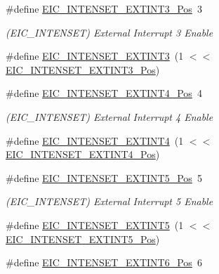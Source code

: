 \begin{DoxyCompactItemize}
\item 
\#define \mbox{\hyperlink{group___s_a_m_d21___e_i_c_gacdaef28157f0fefedf193ab4263975ea}{E\+I\+C\+\_\+\+I\+N\+T\+E\+N\+S\+E\+T\+\_\+\+E\+X\+T\+I\+N\+T3\+\_\+\+Pos}}~3
\begin{DoxyCompactList}\small\item\em (E\+I\+C\+\_\+\+I\+N\+T\+E\+N\+S\+ET) External Interrupt 3 Enable \end{DoxyCompactList}\item 
\#define \mbox{\hyperlink{group___s_a_m_d21___e_i_c_ga675accece5429161f799fe792021924f}{E\+I\+C\+\_\+\+I\+N\+T\+E\+N\+S\+E\+T\+\_\+\+E\+X\+T\+I\+N\+T3}}~(1 $<$$<$ \mbox{\hyperlink{group___s_a_m_d21___e_i_c_gacdaef28157f0fefedf193ab4263975ea}{E\+I\+C\+\_\+\+I\+N\+T\+E\+N\+S\+E\+T\+\_\+\+E\+X\+T\+I\+N\+T3\+\_\+\+Pos}})
\item 
\#define \mbox{\hyperlink{group___s_a_m_d21___e_i_c_ga5a46c4311103844b309fa994ff4390dd}{E\+I\+C\+\_\+\+I\+N\+T\+E\+N\+S\+E\+T\+\_\+\+E\+X\+T\+I\+N\+T4\+\_\+\+Pos}}~4
\begin{DoxyCompactList}\small\item\em (E\+I\+C\+\_\+\+I\+N\+T\+E\+N\+S\+ET) External Interrupt 4 Enable \end{DoxyCompactList}\item 
\#define \mbox{\hyperlink{group___s_a_m_d21___e_i_c_gac5a21705f81eef53ce4bcfbac5553187}{E\+I\+C\+\_\+\+I\+N\+T\+E\+N\+S\+E\+T\+\_\+\+E\+X\+T\+I\+N\+T4}}~(1 $<$$<$ \mbox{\hyperlink{group___s_a_m_d21___e_i_c_ga5a46c4311103844b309fa994ff4390dd}{E\+I\+C\+\_\+\+I\+N\+T\+E\+N\+S\+E\+T\+\_\+\+E\+X\+T\+I\+N\+T4\+\_\+\+Pos}})
\item 
\#define \mbox{\hyperlink{group___s_a_m_d21___e_i_c_gaa6dcb5d4e8e279bf628858b20421df8b}{E\+I\+C\+\_\+\+I\+N\+T\+E\+N\+S\+E\+T\+\_\+\+E\+X\+T\+I\+N\+T5\+\_\+\+Pos}}~5
\begin{DoxyCompactList}\small\item\em (E\+I\+C\+\_\+\+I\+N\+T\+E\+N\+S\+ET) External Interrupt 5 Enable \end{DoxyCompactList}\item 
\#define \mbox{\hyperlink{group___s_a_m_d21___e_i_c_ga313391eefbeee5d95e5052b7e65adc79}{E\+I\+C\+\_\+\+I\+N\+T\+E\+N\+S\+E\+T\+\_\+\+E\+X\+T\+I\+N\+T5}}~(1 $<$$<$ \mbox{\hyperlink{group___s_a_m_d21___e_i_c_gaa6dcb5d4e8e279bf628858b20421df8b}{E\+I\+C\+\_\+\+I\+N\+T\+E\+N\+S\+E\+T\+\_\+\+E\+X\+T\+I\+N\+T5\+\_\+\+Pos}})
\item 
\#define \mbox{\hyperlink{group___s_a_m_d21___e_i_c_ga5413d77895a28fb5fc89965ab1d29a26}{E\+I\+C\+\_\+\+I\+N\+T\+E\+N\+S\+E\+T\+\_\+\+E\+X\+T\+I\+N\+T6\+\_\+\+Pos}}~6
$$
\end{DoxyCompactItemize}
